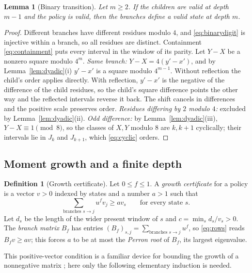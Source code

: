 \documentclass[11pt]{article}
\newtheorem{lemma}[theorem]{Lemma}
\theoremstyle{definition}
\newtheorem{definition}[theorem]{Definition}
\theoremstyle{remark}
\begin{document}
\begin{lemma}[Binary transition]\label{lem:binary}
Let $m\ge2$. If the children are valid at depth $m-1$ and the policy is
valid, then the branches define a valid state at depth $m$.
\end{lemma}
\begin{proof}
Different branches have different residues modulo $4$, and
\eqref{eq:binarydigit} is injective within a branch, so all residues are
distinct. Containment \eqref{eq:containment} puts every interval in the window
of its parity. Let $Y-X$ be a nonzero square modulo $4^m$.
\emph{Same branch:} $Y-X=4(y'-x')$, and by Lemma~\ref{lem:dyadic}(i)
$y'-x'$ is a square modulo $4^{m-1}$. Without reflection the child's order
applies directly. With reflection, $y'-x'$ is the negative of the difference
of the child residues, so the child's square difference points the other way
and the reflected intervals reverse it back. The shift cancels in differences
and the positive scale preserves order.
\emph{Residues differing by $2$ modulo $4$:} excluded by
Lemma~\ref{lem:dyadic}(ii).
\emph{Odd difference:} by Lemma~\ref{lem:dyadic}(iii), $Y-X\equiv1\pmod8$, so
the classes of $X,Y$ modulo $8$ are $k,k+1$ cyclically; their intervals lie in
$J_k$ and $J_{k+1}$, which \eqref{eq:cyclic} orders.
\end{proof}

\subsection{Moment growth and a finite depth}
\begin{definition}[Growth certificate]\label{def:growthcert}
Let $0\le f\le1$. A \emph{growth certificate} for a policy is a vector $v>0$
indexed by states and a number $a>1$ such that
\begin{equation}\label{eq:rows}
 \sum_{\text{branches }s\to j}u^fv_j\ge av_s\qquad\text{for every state }s.
\end{equation}
Let $d_s$ be the length of the wider present window of $s$ and
$c=\min_sd_s/v_s>0$. The \emph{branch matrix} $B_f$ has entries
$(B_f)_{s,j}=\sum_{\text{branches }s\to j}u^f$, so \eqref{eq:rows} reads
$B_fv\ge av$; this forces $a$ to be at most the \emph{Perron root} of
$B_f$, its largest eigenvalue.
\end{definition}
This positive-vector condition is a familiar device for bounding the growth of
a nonnegative matrix \cite{Seneta2006}; here only the following elementary
induction is needed.
\end{document}
